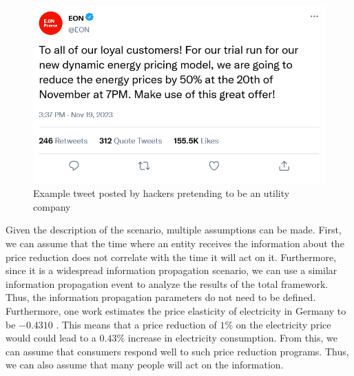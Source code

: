 \begin{figure}[!ht]
    \center
    \includegraphics[scale=.4]{figs/eondemandresponse.png}
    \caption{Example tweet posted by hackers pretending to be an utility company}
    \label{demandtweet}
\end{figure}

Given the description of the scenario, multiple assumptions can be made.
First, we can assume that the time where an entity receives the information
about the price reduction does not correlate with the time it will act on
it. Furthermore, since it is a widespread information propagation scenario,
we can use a similar information propagation event to analyze the 
results of the total framework. Thus, the information propagation
parameters do not need to be defined. Furthermore, one work estimates 
the price elasticity of electricity in Germany to be $-0.4310$
\cite{priceelasticity}. 
This means that a price reduction of $1\%$
on the electricity price would could lead to a $0.43\%$ increase in
electricity consumption. From this, we can assume that consumers 
respond well to such price reduction programs. Thus, we can also assume 
that many people will act on the information.

